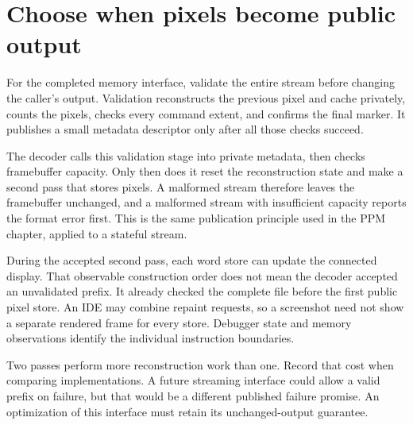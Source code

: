 \section{Choose when pixels become public output}
For the completed memory interface, validate the entire stream before changing the
caller's output. Validation reconstructs the previous pixel and cache privately,
counts the pixels, checks every command extent, and confirms the final marker. It
publishes a small metadata descriptor only after all those checks succeed.

The decoder calls this validation stage into private metadata, then checks framebuffer
capacity. Only then does it reset the reconstruction state and make a second pass that
stores pixels. A malformed stream therefore leaves the framebuffer unchanged, and a
malformed stream with insufficient capacity reports the format error first. This is
the same publication principle used in the PPM chapter, applied to a stateful stream.

During the accepted second pass, each word store can update the connected display.
That observable construction order does not mean the decoder accepted an unvalidated
prefix. It already checked the complete file before the first public pixel store.
An IDE may combine repaint requests, so a screenshot need not show a separate rendered
frame for every store. Debugger state and memory observations identify the individual
instruction boundaries.

Two passes perform more reconstruction work than one. Record that cost when comparing
implementations. A future streaming interface could allow a valid prefix on failure,
but that would be a different published failure promise. An optimization of this
interface must retain its unchanged-output guarantee.
